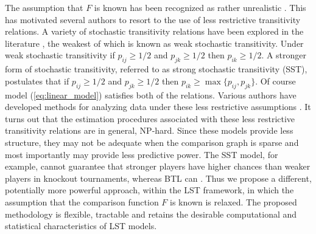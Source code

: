 \documentclass[twoside,11pt]{article}
\begin{document}
The assumption that $F$ is known has been recognized as rather unrealistic \citep{morrison,david,regenwetter1,hwang,shah,heckel}. 
This has motivated several authors to resort to the use of less restrictive transitivity relations.  A variety of stochastic transitivity relations have been explored in the literature \citep{morrison,regenwetter3,oliveira}, the weakest of which is known as weak stochastic transitivity. Under weak stochastic transitivity if $p_{ij}\geq 1/2$ and $p_{jk} \geq 1/2$ then $ p_{ik} \geq 1/2$. A stronger form of stochastic transitivity, referred to as strong stochastic transitivity (SST), postulates that if $p_{ij}\geq 1/2$ and $p_{jk} \geq 1/2$ then $ p_{ik} \geq \max\{p_{ij},p_{jk}\}$. Of course model (\ref{eq:linear_model}) satisfies both of the relations. Various authors have developed methods for analyzing data under these less restrictive assumptions \citep{decani, regenwetter1, chatterjee, shah}. It turns out that the estimation procedures associated with these less restrictive transitivity relations are in general, NP-hard. Since these models provide less structure, they may not be adequate when the comparison graph is sparse and most importantly may provide less predictive power.  The SST model, for example, cannot guarantee that stronger players have higher chances than weaker players in knockout tournaments, whereas BTL can  \citep{chung1, israel, adler, baek}. Thus we propose a different, potentially more powerful approach, within the LST framework, in which the assumption that the comparison function $F$ is known is relaxed. The proposed methodology is flexible, tractable and retains the desirable computational and statistical characteristics of LST models. 
\end{document}
